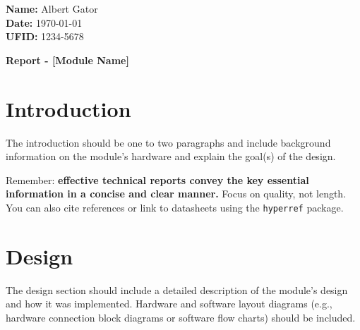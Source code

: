\documentclass{article}
\begin{document}
\noindent \textbf{Name:} Albert Gator \\
\textbf{Date:} \today \\ %
\textbf{UFID:} 1234-5678

\begin{center} %
    \large\textbf{Report - [Module Name]}
\end{center}

\section{Introduction}
The introduction should be one to two paragraphs and include background information on the module’s hardware and explain the goal(s) of the design. %

\noindent Remember: \textbf{effective technical reports convey the key essential information in a concise and clear manner.} Focus on quality, not length. You can also cite references or link to datasheets using the \texttt{hyperref} package.

\section{Design}
The design section should include a detailed description of the module’s design and how it was implemented. Hardware and software layout diagrams (e.g., hardware connection block diagrams or software flow charts) should be included.

\end{document}
